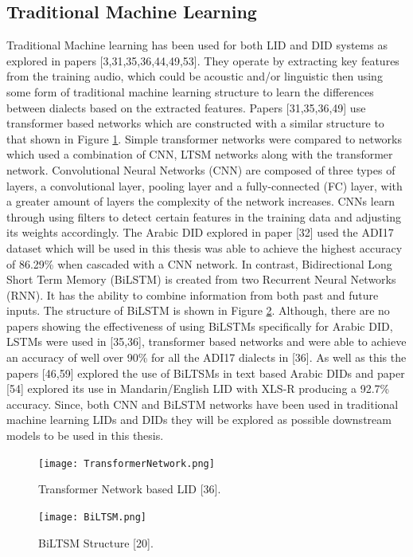 \subsection{Traditional Machine Learning}\label{sec:tradML}
Traditional Machine learning has been used for both LID and DID systems as explored in papers [3,31,35,36,44,49,53]. 
They operate by extracting key features from the training audio, which could be acoustic and/or linguistic then using some form 
of traditional machine learning structure to learn the differences between dialects based on the extracted features. Papers [31,35,36,49] use 
transformer based networks which are constructed with a similar structure to that shown in Figure \ref{fig:transformerLID}. Simple transformer 
networks were compared to networks which used a combination of CNN, LTSM networks along with the transformer network. Convolutional Neural Networks (CNN)
are composed of three types of layers, a convolutional layer, pooling layer and a fully-connected (FC) layer, with a greater amount of layers the complexity of 
the network increases. CNNs learn through using filters to detect certain features in the training data and adjusting its weights accordingly. The Arabic DID explored in paper [32]
used the ADI17 dataset which will be used in this thesis was able to achieve the highest accuracy of 86.29\% when cascaded with a CNN network.  
In contrast, Bidirectional Long Short Term Memory (BiLSTM) is created from two Recurrent Neural Networks (RNN). It has the ability to combine information from both past and future inputs. 
The structure of BiLSTM is shown in Figure \ref{fig:BiLTSM}. 
Although, there are no papers showing the effectiveness of using BiLSTMs specifically for Arabic DID, LSTMs were used in [35,36], transformer based networks 
and were able to achieve an accuracy of well over 90\% for all the ADI17 dialects in [36]. As well as this the papers [46,59] explored the use of BiLTSMs in text based Arabic DIDs and paper [54] explored
its use in Mandarin/English LID with XLS-R producing a 92.7\% accuracy.
Since, both CNN and BiLSTM networks have been used in traditional machine learning LIDs and DIDs they will be explored as possible downstream models to be used in this thesis.

\begin{figure}[h!]
    \centering
    \texttt{[image: TransformerNetwork.png]}
    \caption{Transformer Network based LID [36].}
    \label{fig:transformerLID}
\end{figure}

\begin{figure}[h!]
    \centering
    \texttt{[image: BiLTSM.png]}
    \caption{BiLTSM Structure [20].}
    \label{fig:BiLTSM}
\end{figure}


